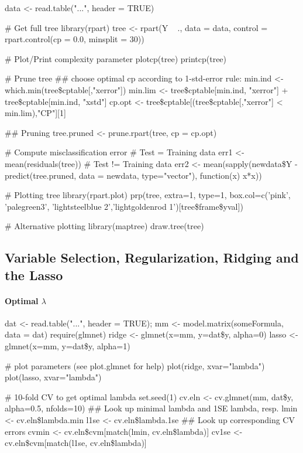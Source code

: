 \begin{code}
 data <- read.table("...", header = TRUE)
 
 # Get full tree
 library(rpart)
 tree <- rpart(Y ~ ., data = data, control = rpart.control(cp = 0.0, minsplit = 30))
 
 # Plot/Print complexity parameter
 plotcp(tree)
 printcp(tree)
 
 # Prune tree
 ## choose optimal cp according to 1-std-error rule:
 min.ind <- which.min(tree\$cptable[,"xerror"])
 min.lim <- tree\$cptable[min.ind, "xerror"] + tree\$cptable[min.ind, "xstd"]
 cp.opt <- tree\$cptable[(tree\$cptable[,"xerror"] < min.lim),"CP"][1]
 
 ## Pruning
 tree.pruned <- prune.rpart(tree, cp = cp.opt)
 
 # Compute misclassification error
 # Test = Training data
 err1 <- mean(residuals(tree))
 # Test != Training data
 err2 <- mean(sapply(newdata\$Y - predict(tree.pruned, data = newdata, type="vector"), function(x) x*x))
 
 # Plotting tree
 library(rpart.plot)
 prp(tree, extra=1, type=1, 
   box.col=c('pink', 'palegreen3', 
             'lightsteelblue 2','lightgoldenrod 1')[tree\$frame\$yval])

 # Alternative plotting
 library(maptree)
 draw.tree(tree)
\end{code}

\subsection{Variable Selection, Regularization, Ridging and the Lasso}
\begin{theory}
 \paragraph{Optimal $\lambda$}
\end{theory}

\begin{code}
 dat <- read.table("...", header = TRUE);
 mm <- model.matrix(someFormula, data = dat)
 require(glmnet)
 ridge <- glmnet(x=mm, y=dat\$y, alpha=0)
 lasso <- glmnet(x=mm, y=dat\$y, alpha=1)
 
 # plot parameters (see plot.glmnet for help)
 plot(ridge, xvar="lambda")
 plot(lasso, xvar="lambda")
 
 # 10-fold CV to get optimal lambda
 set.seed(1)
 cv.eln <- cv.glmnet(mm, dat\$y, alpha=0.5, nfolds=10)
 ## Look up minimal lambda and 1SE lambda, resp.
 lmin <- cv.eln\$lambda.min
 l1se <- cv.eln\$lambda.1se
 ## Look up corresponding CV errors
 cvmin <- cv.eln\$cvm[match(lmin, cv.eln\$lambda)]
 cv1se <- cv.eln\$cvm[match(l1se, cv.eln\$lambda)]
 
\end{code}
